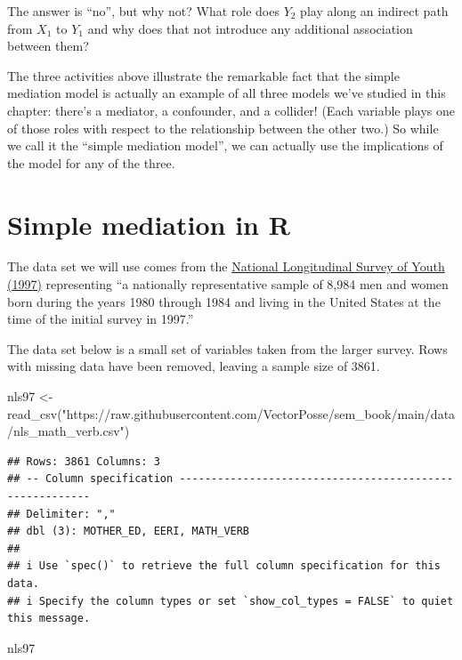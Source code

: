 \documentclass[
]{book}
\newenvironment{Shaded}{\begin{snugshade}}{\end{snugshade}}
\newcommand{\FunctionTok}[1]{\textcolor[rgb]{0.00,0.00,0.00}{#1}}
\newcommand{\NormalTok}[1]{#1}
\newcommand{\OtherTok}[1]{\textcolor[rgb]{0.56,0.35,0.01}{#1}}
\newcommand{\StringTok}[1]{\textcolor[rgb]{0.31,0.60,0.02}{#1}}
\begin{document}
The answer is ``no'', but why not? What role does \(Y_{2}\) play along an indirect path from \(X_{1}\) to \(Y_{1}\) and why does that not introduce any additional association between them?

The three activities above illustrate the remarkable fact that the simple mediation model is actually an example of all three models we've studied in this chapter: there's a mediator, a confounder, and a collider! (Each variable plays one of those roles with respect to the relationship between the other two.) So while we call it the ``simple mediation model'', we can actually use the implications of the model for any of the three.

\hypertarget{mediation-r}{%
\section{Simple mediation in R}\label{mediation-r}}

The data set we will use comes from the \href{https://www.bls.gov/nls/nlsy97.htm}{National Longitudinal Survey of Youth (1997)} representing ``a nationally representative sample of 8,984 men and women born during the years 1980 through 1984 and living in the United States at the time of the initial survey in 1997.''

The data set below is a small set of variables taken from the larger survey. Rows with missing data have been removed, leaving a sample size of 3861.

\begin{Shaded}
\begin{Highlighting}[]
\NormalTok{nls97 }\OtherTok{\textless{}{-}} \FunctionTok{read\_csv}\NormalTok{(}\StringTok{"https://raw.githubusercontent.com/VectorPosse/sem\_book/main/data/nls\_math\_verb.csv"}\NormalTok{)}
\end{Highlighting}
\end{Shaded}

\begin{verbatim}
## Rows: 3861 Columns: 3
## -- Column specification --------------------------------------------------------
## Delimiter: ","
## dbl (3): MOTHER_ED, EERI, MATH_VERB
## 
## i Use `spec()` to retrieve the full column specification for this data.
## i Specify the column types or set `show_col_types = FALSE` to quiet this message.
\end{verbatim}

\begin{Shaded}
\begin{Highlighting}[]
\NormalTok{nls97}
\end{Highlighting}
\end{Shaded}
\end{document}
